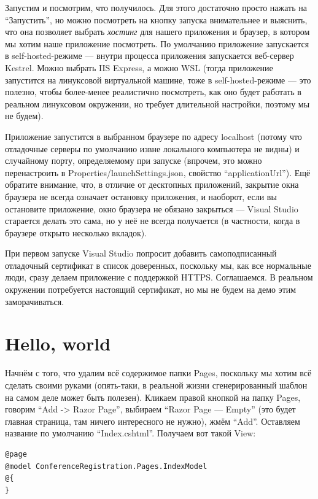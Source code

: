 \documentclass{../../text-style}
\begin{document}
Запустим и посмотрим, что получилось. Для этого достаточно просто нажать на \enquote{Запустить}, но можно посмотреть на кнопку запуска внимательнее и выяснить, что она позволяет выбрать \textit{хостинг} для нашего приложения и браузер, в котором мы хотим наше приложение посмотреть. По умолчанию приложение запускается в self-hosted-режиме --- внутри процесса приложения запускается веб-сервер Kestrel. Можно выбрать IIS Express, а можно WSL (тогда приложение запустится на линуксовой виртуальной машине, тоже в self-hosted-режиме --- это полезно, чтобы более-менее реалистично посмотреть, как оно будет работать в реальном линуксовом окружении, но требует длительной настройки, поэтому мы не будем). 

Приложение запустится в выбранном браузере по адресу localhost (потому что отладочные серверы по умолчанию извне локального компьютера не видны) и случайному порту, определяемому при запуске (впрочем, это можно перенастроить в Properties/launchSettings.json, свойство \enquote{applicationUrl}). Ещё обратите внимание, что, в отличие от десктопных приложений, закрытие окна браузера не всегда означает остановку приложения, и наоборот, если вы остановите приложение, окно браузера не обязано закрыться --- Visual Studio старается делать это сама, но у неё не всегда получается (в частности, когда в браузере открыто несколько вкладок).

При первом запуске Visual Studio попросит добавить самоподписанный отладочный сертификат в список доверенных, поскольку мы, как все нормальные люди, сразу делаем приложение с поддержкой HTTPS. Соглашаемся. В реальном окружении потребуется настоящий сертификат, но мы не будем на демо этим заморачиваться.

\section{Hello, world}

Начнём с того, что удалим всё содержимое папки Pages, поскольку мы хотим всё сделать своими руками (опять-таки, в реальной жизни сгенерированный шаблон на самом деле может быть полезен). Кликаем правой кнопкой на папку Pages, говорим \enquote{Add -> Razor Page}, выбираем \enquote{Razor Page --- Empty} (это будет главная страница, там ничего интересного не нужно), жмём \enquote{Add}. Оставляем название по умолчанию \enquote{Index.cshtml}. Получаем вот такой View:

\begin{verbatim}
@page
@model ConferenceRegistration.Pages.IndexModel
@{
}
\end{verbatim}
\end{document}
